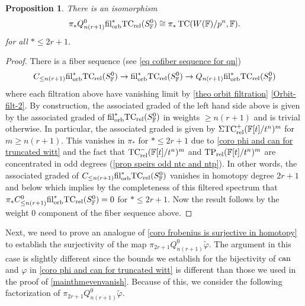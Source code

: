 \documentclass[english,10pt]{amsart}
\newcommand{\rel}{\textup{rel}}
\newcommand{\field}{\mathbb{F}}
\newtheorem{prop}{Proposition}[section]
\theoremstyle{definition}
\numberwithin{equation}{section}
\DeclareMathOperator{\tc}{\ensuremath{\textup{TC}}}
\newcommand{\rntc}{\mathrm{TC}_{\rel}^{-}}
\newcommand{\rtp}{\mathrm{TP}_{\rel}}
\newcommand{\rtc}{\mathrm{TC}_{\rel}}
\newcommand{\filorb}{\mathrm{fil}^{*}_{\textup{orb}}}
\newcommand{\pis}{\pi_*}
\begin{document}
\begin{prop}\label{prop tc apprxmation with qn for truncated witt}
There is an isomorphism 
\[\pi_{*}Q_{n(r+1)}^0 \filorb  \rtc(S_{\field}^0) \cong \pi_{*} \tc(W(\field)/p^n,\field).\]
for all $*\leq 2r+1$.
\end{prop}
\begin{proof}

There is a fiber sequence (see \eqref{eq cofiber sequence for qn}) 
\[C_{\leq n(r+1)}\filorb\rtc(S_{\field}^0) \to \filorb\rtc(S_{\field}^0) \to Q_{n(r+1)}\filorb \rtc(S_{\field}^0)\]
where each filtration above have vanishing limit by \autoref{theo orbit filtration} \eqref{Orbit-filt-2}. By construction, the associated graded of the left hand side above is  given by the associated graded of $\filorb\rtc(S_{\field}^0)$ in weights $\geq n(r+1)$ and is trivial otherwise. 
In particular, the associated graded is given by $\Sigma \rtc^+(\field[t]/t^n)^m$ for $m \geq n(r+1)$. This vanishes in $\pis$ for $*\leq 2r+1$ due to \autoref{coro phi and can for truncated witt} and the fact that $\rntc(\field[t]/t^n)^m$ and $\rtp(\field[t]/t^n)^m$ are concentrated in odd degrees (\autoref{prop speirs odd ntc and ntp}). In other words, the associated graded of $C_{\leq n(r+1)}\filorb\rtc(S_{\field}^0)$ vanishes in homotopy degree $2r+1$ and below which implies by the completeness of this filtered spectrum that $\pis C_{\leq n(r+1)}^0\filorb\rtc(S_{\field}^0) = 0$ for $*\leq 2r+1$. Now the result follows by the weight $0$ component of the fiber sequence above. 
\end{proof}  

Next, we need to prove an analogue of \autoref{coro frobenius is surjective in homotopy} to establish the surjectivity of the map $\pi_{2r+1}Q_{n(r+1)}^0\widetilde{\varphi}$. The argument in this case is slightly different since the bounds we establish for the bijectivity of $\textup{can}$ and $\varphi$ in \autoref{coro phi and can for truncated witt} is different than those we used in the proof of \autoref{mainthmevenvanish}. Because of this, we consider the following factorization of $\pi_{2r+1}Q_{n(r+1)}^0\widetilde{\varphi}$.
\end{document}
